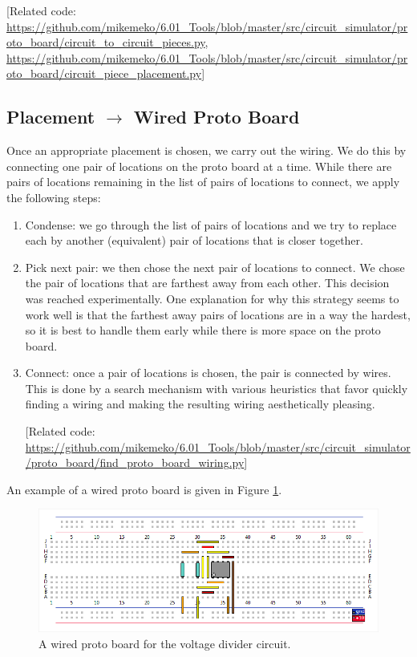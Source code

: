 \documentclass[12pt]{amsart}
\begin{document}
[Related code: \url{https://github.com/mikemeko/6.01_Tools/blob/master/src/circuit_simulator/proto_board/circuit_to_circuit_pieces.py}, \url{https://github.com/mikemeko/6.01_Tools/blob/master/src/circuit_simulator/proto_board/circuit_piece_placement.py}]

\subsection{Placement $\rightarrow$ Wired Proto Board}

Once an appropriate placement is chosen, we carry out the wiring. We do this by connecting one pair of locations on the proto board at a time. While there are pairs of locations remaining in the list of pairs of locations to connect, we apply the following steps:

\begin{enumerate}
\item Condense: we go through the list of pairs of locations and we try to replace each by another (equivalent) pair of locations that is closer together.
\item Pick next pair: we then chose the next pair of locations to connect. We chose the pair of locations that are farthest away from each other. This decision was reached experimentally. One explanation for why this strategy seems to work well is that the farthest away pairs of locations are in a way the hardest, so it is best to handle them early while there is more space on the proto board.
\item Connect: once a pair of locations is chosen, the pair is connected by wires. This is done by a search mechanism with various heuristics that favor quickly finding a wiring and making the resulting wiring aesthetically pleasing.

[Related code: \url{https://github.com/mikemeko/6.01_Tools/blob/master/src/circuit_simulator/proto_board/find_proto_board_wiring.py}]
\end{enumerate}

An example of a wired proto board is given in Figure \ref{fig:wired}.

\begin{figure}
\includegraphics[width=\linewidth]{Images/Wired_Proto_Board.png}
\caption{A wired proto board for the voltage divider circuit.}
\label{fig:wired}
\end{figure}
\end{document}
